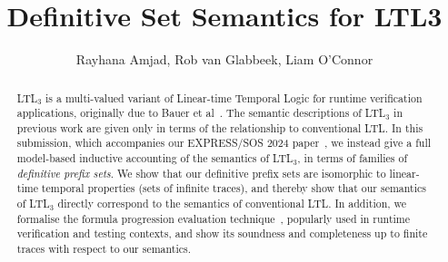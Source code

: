 \documentclass[11pt,a4paper]{scrreprt}
\newcommand{\ltlthree}[0]{LTL$_3$\xspace}
\newcommand{\LT}{linear-time\xspace}
\newcommand{\LTL}{Linear-time Temporal Logic\xspace}
\begin{document}
\title{Definitive Set Semantics for LTL3}
\author{Rayhana Amjad, Rob van Glabbeek, Liam O'Connor}
\maketitle

\begin{abstract}
\ltlthree is a multi-valued variant of \LTL for runtime verification applications, originally due to Bauer et al~\cite{ltl3tosem}. The semantic descriptions of \ltlthree in previous work are given only in terms of the relationship to conventional LTL\@. In this submission, which accompanies our EXPRESS/SOS 2024 paper~\cite{expresssos}, we instead give a full model-based inductive accounting of the semantics of \ltlthree, in terms of families of \emph{definitive prefix sets}. We show that our definitive prefix sets are isomorphic to \LT temporal properties (sets of infinite traces), and thereby show that our semantics of \ltlthree directly correspond to the semantics of conventional LTL\@. In addition, we formalise the formula progression evaluation technique~\cite{progress1,progress2}, popularly used in runtime verification and testing contexts, and show its soundness and completeness up to finite traces with respect to our semantics.
\end{abstract}

\tableofcontents
$ $\\[2em]




\end{document}
